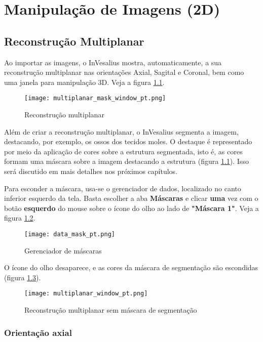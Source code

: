 \chapter{Manipulação de Imagens (2D)}

\section{Reconstrução Multiplanar}

Ao importar as imagens, o InVesalius mostra, automaticamente, a sua reconstrução
multiplanar nas orientações Axial, Sagital e Coronal, bem como uma janela para manipulação 3D.
Veja a figura \ref{fig:mpr}.

\begin{figure}[!htb]
\centering
\texttt{[image: multiplanar\_mask\_window\_pt.png]}
\caption{Reconstrução multiplanar}
\label{fig:mpr}
\end{figure}

\newpage

Além de criar a reconstrução multiplanar, o InVesalius segmenta a imagem, destacando, por exemplo, os
ossos dos tecidos moles. O destaque é representado por meio da aplicação de cores sobre a estrutura
segmentada, isto é, as cores formam uma máscara sobre a imagem destacando a estrutura (figura
\ref{fig:mpr}). Isso será discutido em mais detalhes nos próximos capítulos.

Para esconder a máscara, usa-se o gerenciador de dados, localizado no canto inferior esquerdo
da tela. Basta escolher a aba \textbf{Máscaras} e clicar \textbf{uma} vez com o botão
\textbf{esquerdo} do mouse sobre o ícone do olho ao lado de \textbf{"Máscara 1"}. Veja a figura
\ref{fig:ger_masc}.

\begin{figure}[!htb]
\centering
\texttt{[image: data\_mask\_pt.png]}
\caption{Gerenciador de máscaras}
\label{fig:ger_masc}
\end{figure}

O ícone do olho desaparece, e as cores da máscara de segmentação são escondidas (figura
\ref{fig:mpr_sem_mask}).

\begin{figure}[!htb]
\centering
\texttt{[image: multiplanar\_window\_pt.png]}
\caption{Reconstrução multiplanar sem máscara de segmentação}
\label{fig:mpr_sem_mask}
\end{figure}

\subsection{Orientação axial}

